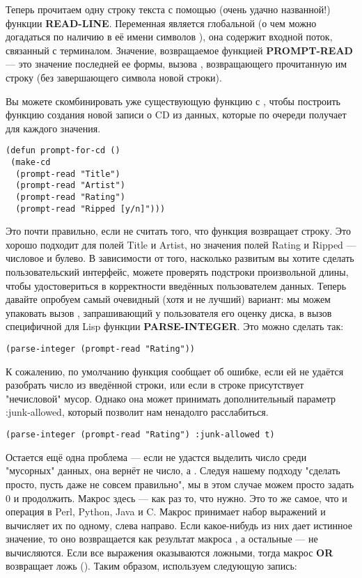 Теперь прочитаем одну строку текста с помощью (очень удачно названной!) функции
\textbf{READ-LINE}. Переменная  является глобальной (о чем можно
догадаться по наличию в её имени символов \code{*}), она содержит входной поток, связанный
с терминалом. Значение, возвращаемое функцией \textbf{PROMPT-READ} --- это значение
последней ее формы, вызова , возвращающего прочитанную им строку (без
завершающего символа новой строки).

Вы можете скомбинировать уже существующую функцию  с ,
чтобы построить функцию создания новой записи о CD из данных, которые  по
очереди получает для каждого значения.

\begin{lstlisting}
(defun prompt-for-cd ()
 (make-cd
  (prompt-read "Title")
  (prompt-read "Artist")
  (prompt-read "Rating")
  (prompt-read "Ripped [y/n]")))
\end{lstlisting}

Это почти правильно, если не считать того, что функция  возвращает
строку. Это хорошо подходит для полей Title и Artist, но значения полей Rating и Ripped
--- числовое и булево. В зависимости от того, насколько развитым вы хотите сделать
пользовательский интерфейс, можете проверять подстроки произвольной длины, чтобы
удостовериться в корректности введённых пользователем данных. Теперь давайте опробуем
самый очевидный (хотя и не лучший) вариант: мы можем упаковать вызов ,
запрашивающий у пользователя его оценку диска, в вызов специфичной для Lisp функции
\textbf{PARSE-INTEGER}. Это можно сделать так:

\begin{lstlisting}
(parse-integer (prompt-read "Rating"))
\end{lstlisting}

К сожалению, по умолчанию функция  сообщает об ошибке, если ей не
удаётся разобрать число из введённой строки, или если в строке присутствует "нечисловой"
мусор. Однако она может принимать дополнительный параметр :junk-allowed, который позволит
нам ненадолго расслабиться.

\begin{lstlisting}
(parse-integer (prompt-read "Rating") :junk-allowed t)
\end{lstlisting}

Остается ещё одна проблема --- если  не удастся выделить число среди
"мусорных" данных, она вернёт не число, а . Следуя нашему подходу "сделать
просто, пусть даже не совсем правильно", мы в этом случае можем просто задать 0 и
продолжить. Макрос  здесь --- как раз то, что нужно. Это то же самое, что и
операция \code{||} в Perl, Python, Java и C. Макрос принимает набор выражений и
вычисляет их по одному, слева направо. Если какое-нибудь из них дает истинное значение, то
оно возвращается как результат макроса , а остальные --- не вычисляются. Если
все выражения оказываются ложными, тогда макрос \textbf{OR} возвращает ложь
(). Таким образом, используем следующую запись:

